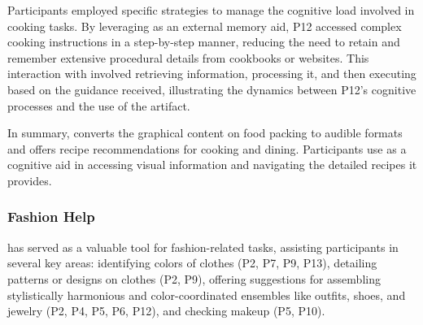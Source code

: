 Participants employed specific strategies to manage the cognitive load involved in cooking tasks. By leveraging \bma{} as an external memory aid, P12 accessed complex cooking instructions in a step-by-step manner, reducing the need to retain and remember extensive procedural details from cookbooks or websites. 
% 
% 
This interaction with \bma{} involved retrieving information, processing it, and then executing based on the guidance received, illustrating the dynamics between P12's cognitive processes and the use of the artifact. 



In summary, \bma{} converts the graphical content on food packing to audible formats and offers recipe recommendations for cooking and dining. Participants use \bma{} as a cognitive aid in accessing visual information and navigating the detailed recipes it provides. 


\subsubsection{Fashion Help}
\label{fashion}
\bma{} has served as a valuable tool for fashion-related tasks, assisting participants in several key areas: identifying colors of clothes (P2, P7, P9, P13), detailing patterns or designs on clothes (P2, P9), offering suggestions for assembling stylistically harmonious and color-coordinated ensembles like outfits, shoes, and jewelry (P2, P4, P5, P6, P12), and checking makeup (P5, P10).
% 






